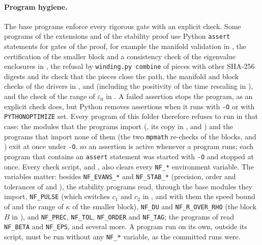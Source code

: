 \documentclass[11pt]{article}
\theoremstyle{definition}
\newcommand{\eps}{\varepsilon}
\begin{document}
\paragraph{Program hygiene.} The base programs enforce every rigorous gate with an explicit check. Some programs of the extensions and of the stability proof use Python \texttt{assert} statements for gates of the proof, for example the manifold validation in , the certification of the smaller block and a consistency check of the eigenvalue enclosures in , the refusal by \texttt{winding.py combine} of pieces with other SHA-256 digests and its check that the pieces close the path, the manifold and block checks of the drivers in ,  and  (including the positivity of the time rescaling in ), and the check of the range of $\eps_0$ in . A failed assertion stops the program, as an explicit check does, but Python removes assertions when it runs with \texttt{-O} or with \texttt{PYTHONOPTIMIZE} set. Every program of this folder therefore refuses to run in that case: the modules that the programs import (, its copy in ,  and ) and the programs that import none of them (the two \texttt{mpmath} re-checks of the blocks,  and ) exit at once under \texttt{-O}, so an assertion is active whenever a program runs; each program that contains an \texttt{assert} statement was started with \texttt{-O} and stopped at once. Every check script, and , also clears every \texttt{NF\_*} environment variable. The variables matter: besides \texttt{NF\_EVANS\_*} and \texttt{NF\_STAB\_*} (precision, order and tolerances of  and ), the stability programs read, through the base modules they import, \texttt{NF\_PULSE} (which switches $c_1$ and $c_2$ in , and with them the speed bound of  and the range of $\kappa$ of the smaller block), \texttt{NF\_DU} and \texttt{NF\_R\_OVER\_RHO} (the block $B$ in ), and \texttt{NF\_PREC}, \texttt{NF\_TOL}, \texttt{NF\_ORDER} and \texttt{NF\_TAG}; the programs of  read \texttt{NF\_BETA} and \texttt{NF\_EPS}, and  several more. A program run on its own, outside its script, must be run without any \texttt{NF\_*} variable, as the committed runs were.
\end{document}
